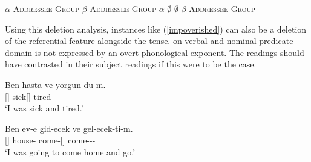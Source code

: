 \begin{exe}
\ex 
\begin{xlist}
    \ex \label{compoundSAtemplate} $\alpha$-\textsc{Addressee}-\textsc{Group} {\And} $\beta$-{\textsc{Addressee}-\textsc{Group}}
    \ex \label{compoundSAtemplate2}$\alpha$-$\emptyset$-$\emptyset$ {\And} $\beta$-{\textsc{Addressee}-\textsc{Group}}
\end{xlist}
\end{exe}

Using this deletion analysis, instances like (\ref{impoverished}) can also be a deletion of the referential feature alongside the tense. {\Tsg} on verbal and nominal predicate domain is not expressed by an overt phonological exponent. The readings should have contrasted in their subject readings if this were to be the case. 

\begin{exe}
    \ex \label{impoverished}
    \begin{xlist}
        \ex \gll Ben hasta ve yorgun-du-m. \\
        {\Fsg}[{\Nom}] sick[{\Tsg}] {\And} tired-{\Pst}-{\Fsg} \\
        \glt `I was sick and tired.'
        
        \ex \gll Ben ev-e gid-ecek ve gel-ecek-ti-m. \\
        {\Fsg}[{\Nom}] house-{\Dat} come-{\Fut}[{\Tsg}] {\And} come-{\Fut}-{\Pst}-{\Fsg} \\
        \glt `I was going to come home and go.'
    \end{xlist}
\end{exe}

